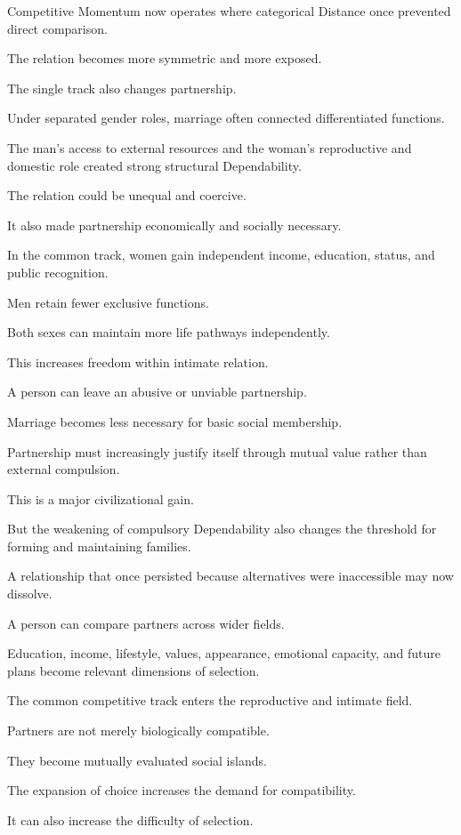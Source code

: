 Competitive Momentum now operates where categorical Distance once prevented direct comparison.

The relation becomes more symmetric and more exposed.

The single track also changes partnership.

Under separated gender roles, marriage often connected differentiated functions.

The man’s access to external resources and the woman’s reproductive and domestic role created strong structural Dependability.

The relation could be unequal and coercive.

It also made partnership economically and socially necessary.

In the common track, women gain independent income, education, status, and public recognition.

Men retain fewer exclusive functions.

Both sexes can maintain more life pathways independently.

This increases freedom within intimate relation.

A person can leave an abusive or unviable partnership.

Marriage becomes less necessary for basic social membership.

Partnership must increasingly justify itself through mutual value rather than external compulsion.

This is a major civilizational gain.

But the weakening of compulsory Dependability also changes the threshold for forming and maintaining families.

A relationship that once persisted because alternatives were inaccessible may now dissolve.

A person can compare partners across wider fields.

Education, income, lifestyle, values, appearance, emotional capacity, and future plans become relevant dimensions of selection.

The common competitive track enters the reproductive and intimate field.

Partners are not merely biologically compatible.

They become mutually evaluated social islands.

The expansion of choice increases the demand for compatibility.

It can also increase the difficulty of selection.

